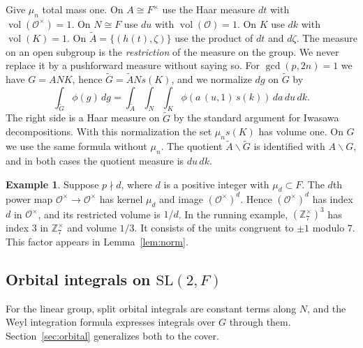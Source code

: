 \documentclass[12pt,letterpaper]{article}
\numberwithin{equation}{section}
\theoremstyle{plain}
\theoremstyle{definition}
\newtheorem{example}[theorem]{Example}
\theoremstyle{remark}
\newcommand{\Gt}{\widetilde G}
\newcommand{\At}{\widetilde A}
\newcommand{\Zz}{\mathbb Z}
\newcommand{\Of}{\mathcal O}
\DeclareMathOperator{\vol}{vol}
\newcommand{\SL}{\mathrm{SL}}
\begin{document}
Give $\mu_n$ total mass one. On $A\cong F^\times$ use the Haar measure
$dt$ with $\vol(\Of^\times)=1$. On $N\cong F$ use $du$ with
$\vol(\Of)=1$. On $K$ use $dk$ with $\vol(K)=1$. On
$\At=\{(h(t),\zeta)\}$ use the product of $dt$ and $d\zeta$. The
measure on an open subgroup is the \emph{restriction} of the measure
on the group. We never replace it by a pushforward measure without
saying so. For $\gcd(p,2n)=1$ we have $G=ANK$, hence $\Gt=\At N s(K)$,
and we normalize $dg$ on $\Gt$ by
\begin{equation}\label{eq:iwasawa}
\int_{\Gt}\phi(g)\,dg=
\int_{\At}\int_N\int_K\phi(a\,(u,1)\,s(k))\,da\,du\,dk .
\end{equation}
The right side is a Haar measure on $\Gt$ by the standard argument for
Iwasawa decompositions. With this normalization the set $\mu_n s(K)$
has volume one. On $G$ we use the same formula without $\mu_n$. The
quotient $\At\backslash\Gt$ is identified with $A\backslash G$, and in
both cases the quotient measure is $du\,dk$.

\begin{example}\label{ex:volume}
Suppose $p\nmid d$, where $d$ is a positive integer with
$\mu_d\subset F$. The $d$th power map $\Of^\times\to\Of^\times$ has
kernel $\mu_d$ and image $(\Of^\times)^d$. Hence $(\Of^\times)^d$ has
index $d$ in $\Of^\times$, and its restricted volume is $1/d$. In the
running example, $(\Zz_7^\times)^3$ has index $3$ in $\Zz_7^\times$ and
volume $1/3$. It consists of the units congruent to $\pm1$ modulo $7$. This factor appears in Lemma~\ref{lem:norm}.
\end{example}

\subsection{Orbital integrals on \texorpdfstring{$\SL(2,F)$}{SL(2,F)}}\label{subsec:orbital-linear}

For the linear group, split orbital integrals are constant terms along
$N$, and the Weyl integration formula expresses integrals over $G$
through them. Section~\ref{sec:orbital} generalizes both to the
cover.
\end{document}
